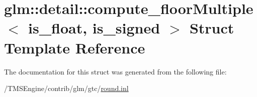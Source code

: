 \hypertarget{structglm_1_1detail_1_1compute__floor_multiple}{}\section{glm\+:\+:detail\+:\+:compute\+\_\+floor\+Multiple$<$ is\+\_\+float, is\+\_\+signed $>$ Struct Template Reference}
\label{structglm_1_1detail_1_1compute__floor_multiple}


The documentation for this struct was generated from the following file\+:\begin{DoxyCompactItemize}
\item 
/\+T\+M\+S\+Engine/contrib/glm/gtc/\hyperlink{round_8inl}{round.\+inl}\end{DoxyCompactItemize}
